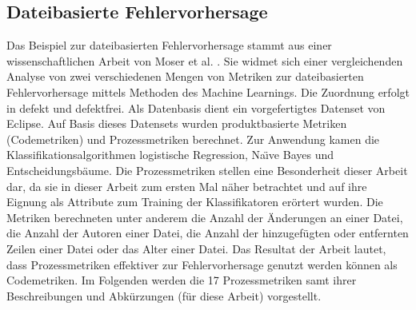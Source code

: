 \subsection*{Dateibasierte Fehlervorhersage}
\label{moser}

Das Beispiel zur dateibasierten Fehlervorhersage stammt aus einer wissenschaftlichen Arbeit von Moser et al. \cite{Moser2008}. Sie widmet sich einer vergleichenden Analyse von zwei verschiedenen Mengen von Metriken zur dateibasierten Fehlervorhersage mittels Methoden des Machine Learnings. Die Zuordnung erfolgt in \glqq defekt\grqq{} und \glqq defektfrei\grqq. Als Datenbasis dient ein vorgefertigtes Datenset von Eclipse. Auf Basis dieses Datensets wurden \glqq produktbasierte\grqq{} Metriken (Codemetriken) und Prozessmetriken berechnet. Zur Anwendung kamen die Klassifikationsalgorithmen logistische Regression, Na\"{\i}ve Bayes und Entscheidungsbäume. Die Prozessmetriken stellen eine Besonderheit dieser Arbeit dar, da sie in dieser Arbeit zum ersten Mal näher betrachtet und auf ihre Eignung als Attribute zum Training der Klassifikatoren erörtert wurden. Die Metriken berechneten unter anderem die Anzahl der Änderungen an einer Datei, die Anzahl der Autoren einer Datei, die Anzahl der hinzugefügten oder entfernten Zeilen einer Datei oder das Alter einer Datei. Das Resultat der Arbeit lautet, dass Prozessmetriken effektiver zur Fehlervorhersage genutzt werden können als Codemetriken. Im Folgenden werden die 17 Prozessmetriken samt ihrer Beschreibungen und Abkürzungen (für diese Arbeit) vorgestellt.


